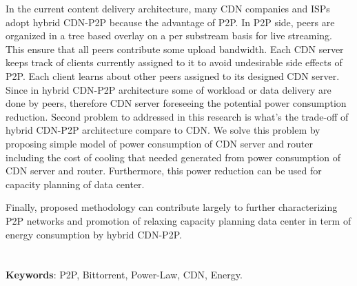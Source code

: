 In the current content delivery architecture, many CDN companies and ISPs adopt hybrid CDN-P2P because the advantage of P2P. 
In P2P side, peers are organized in a tree based overlay on a per substream basis for live streaming.   
This ensure that all peers contribute some upload bandwidth. 
Each CDN server keeps track of clients currently assigned to it to avoid undesirable side effects of P2P.
Each client learns about other peers assigned to its designed CDN server.
Since in hybrid CDN-P2P architecture some of workload or data delivery are done by peers, therefore CDN server foreseeing the potential power consumption reduction. 
Second problem to addressed in this research is what's the trade-off of hybrid CDN-P2P architecture compare to CDN.
We solve this problem by proposing simple model of power consumption of CDN server and router including the cost of cooling that needed generated from power consumption of CDN server and router. 
Furthermore, this power reduction can be used for capacity planning of data center. 

Finally, proposed methodology can contribute largely to further characterizing P2P networks and promotion of relaxing capacity planning data center in term of energy consumption by hybrid CDN-P2P. 
\\
\\
\\
\textbf{Keywords}: P2P, Bittorrent, Power-Law, CDN, Energy.

